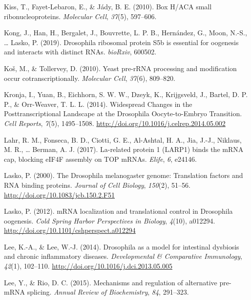 \documentclass[12pt,twoside]{reedthesis}
\newlength{\cslhangindent}
\newenvironment{cslreferences}%
  {\setlength{\parindent}{0pt}%
  \everypar{\setlength{\hangindent}{\cslhangindent}}\ignorespaces}%
  {\par}
\begin{document}
\begin{cslreferences}
\leavevmode\hypertarget{ref-Kiss2010}{}%
Kiss, T., Fayet-Lebaron, E., \& Jády, B. E. (2010). Box H/ACA small ribonucleoproteins. \emph{Molecular Cell}, \emph{37}(5), 597--606.

\leavevmode\hypertarget{ref-Kong2019}{}%
Kong, J., Han, H., Bergalet, J., Bouvrette, L. P. B., Hernández, G., Moon, N.-S., \ldots{} Lasko, P. (2019). Drosophila ribosomal protein S5b is essential for oogenesis and interacts with distinct RNAs. \emph{bioRxiv}, 600502.

\leavevmode\hypertarget{ref-Kos2010}{}%
Koš, M., \& Tollervey, D. (2010). Yeast pre-rRNA processing and modification occur cotranscriptionally. \emph{Molecular Cell}, \emph{37}(6), 809--820.

\leavevmode\hypertarget{ref-Kronja2014}{}%
Kronja, I., Yuan, B., Eichhorn, S. W. W., Dzeyk, K., Krijgsveld, J., Bartel, D. P. P., \& Orr-Weaver, T. L. L. (2014). Widespread Changes in the Posttranscriptional Landscape at the Drosophila Oocyte-to-Embryo Transition. \emph{Cell Reports}, \emph{7}(5), 1495--1508. \url{http://doi.org/10.1016/j.celrep.2014.05.002}

\leavevmode\hypertarget{ref-Lahr2017b}{}%
Lahr, R. M., Fonseca, B. D., Ciotti, G. E., Al-Ashtal, H. A., Jia, J.-J., Niklaus, M. R., \ldots{} Berman, A. J. (2017). La-related protein 1 (LARP1) binds the mRNA cap, blocking eIF4F assembly on TOP mRNAs. \emph{Elife}, \emph{6}, e24146.

\leavevmode\hypertarget{ref-Lasko2000}{}%
Lasko, P. (2000). The Drosophila melanogaster genome: Translation factors and RNA binding proteins. \emph{Journal of Cell Biology}, \emph{150}(2), 51--56. \url{http://doi.org/10.1083/jcb.150.2.F51}

\leavevmode\hypertarget{ref-Lasko2012a}{}%
Lasko, P. (2012). mRNA localization and translational control in Drosophila oogenesis. \emph{Cold Spring Harbor Perspectives in Biology}, \emph{4}(10), a012294. \url{http://doi.org/10.1101/cshperspect.a012294}

\leavevmode\hypertarget{ref-Lee2014c}{}%
Lee, K.-A., \& Lee, W.-J. (2014). Drosophila as a model for intestinal dysbiosis and chronic inflammatory diseases. \emph{Developmental \& Comparative Immunology}, \emph{42}(1), 102--110. \url{http://doi.org/10.1016/j.dci.2013.05.005}

\leavevmode\hypertarget{ref-Lee2015}{}%
Lee, Y., \& Rio, D. C. (2015). Mechanisms and regulation of alternative pre-mRNA splicing. \emph{Annual Review of Biochemistry}, \emph{84}, 291--323.


\end{cslreferences}
\end{document}
